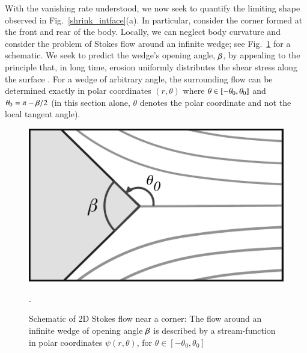 \documentclass[preprint, 10pt]{elsarticle}
\begin{document}
With the vanishing rate understood, we now seek to quantify the limiting shape observed in Fig.~\ref{shrink_intface}(a). In particular, consider the corner formed at the front and rear of the body. Locally, we can neglect body curvature and consider the problem of Stokes flow around an infinite wedge; see Fig.~\ref{corner} for a schematic. We seek to predict the wedge's opening angle, $\beta$, by appealing to the principle that, in long time, erosion uniformly distributes the shear stress along the surface \cite{moo-ris-chi-zha-she2013, moore2017riemann}. For a wedge of arbitrary angle, the surrounding flow can be determined exactly in polar coordinates $(r, \theta)$ where $\theta \in [-\theta_0,\theta_0]$ and $\theta_0 = \pi - \beta/2$ (in this section alone, $\theta$ denotes the polar coordinate and not the local tangent angle). 

\begin{figure}%
\begin{center}
\includegraphics[width = 0.4 \textwidth]{./figs/corner.pdf}
\caption{Schematic of 2D Stokes flow near a corner: The flow around an infinite wedge of opening angle $\beta$ is described by a stream-function in polar coordinates $\psi(r,\theta)$, for $\theta \in [-\theta_0, \theta_0]$}.
\label{corner}
\end{center}
\end{figure}
 
\end{document}
